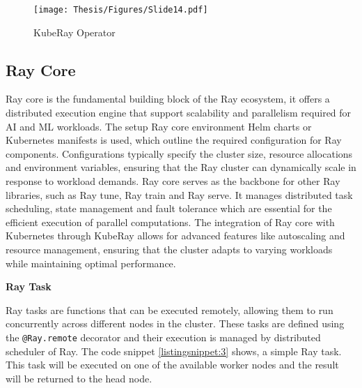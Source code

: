 \clearpage

\captionsetup{justification=centering}
\begin{figure}[h]
\centering
\texttt{[image: Thesis/Figures/Slide14.pdf]}
\caption{\label{fig:KubeRay Operator}KubeRay Operator \cite{r34}}
\end{figure}

\subsection{Ray Core}

Ray core is the fundamental building block of the Ray ecosystem, it offers a distributed execution engine that support scalability and parallelism required for AI and ML workloads. The setup Ray core environment Helm charts or Kubernetes manifests is used, which outline the required configuration for Ray components. Configurations typically specify the cluster size, resource allocations and environment variables, ensuring that the Ray cluster can dynamically scale in response to workload demands. Ray core serves as the backbone for other Ray libraries, such as Ray tune, Ray train and Ray serve. It manages distributed task scheduling, state management and fault tolerance which are essential for the efficient execution of parallel computations. The integration of Ray core with Kubernetes through KubeRay allows for advanced features like autoscaling and resource management, ensuring that the cluster adapts to varying workloads while maintaining optimal performance. \cite{ray_doc}


\textbf{Ray Task}

Ray tasks are functions that can be executed remotely, allowing them to run concurrently across different nodes in the cluster. These tasks are defined using the \texttt{@Ray.remote} decorator and their execution is managed by distributed scheduler of Ray. The code snippet \autoref{listingsnippet:3} shows, a simple Ray task. This task will be executed on one of the available worker nodes and the result will be returned to the head node. \cite{ray_doc}



